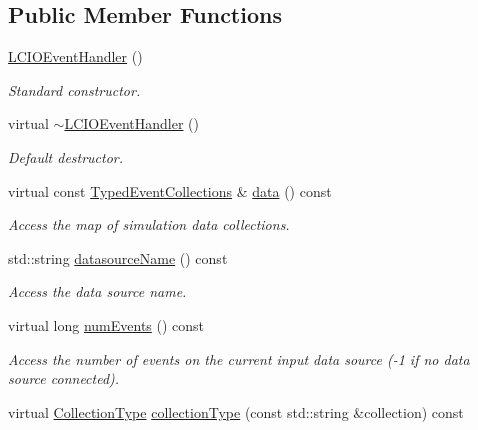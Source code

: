 \subsection*{Public Member Functions}
\begin{DoxyCompactItemize}
\item 
\hyperlink{class_d_d4hep_1_1_l_c_i_o_event_handler_a0b2f4815441b47379605f1059f892a59}{LCIOEventHandler} ()
\begin{DoxyCompactList}\small\item\em Standard constructor. \item\end{DoxyCompactList}\item 
virtual \hyperlink{class_d_d4hep_1_1_l_c_i_o_event_handler_a26f3acb33ae47d75cee43a2268e5945b}{$\sim$LCIOEventHandler} ()
\begin{DoxyCompactList}\small\item\em Default destructor. \item\end{DoxyCompactList}\item 
virtual const \hyperlink{class_d_d4hep_1_1_event_handler_a4d441ff8a824b1e2f278e8b7a6391af3}{TypedEventCollections} \& \hyperlink{class_d_d4hep_1_1_l_c_i_o_event_handler_a7118606d31e1a2a3b988af04a6dbcc2d}{data} () const 
\begin{DoxyCompactList}\small\item\em Access the map of simulation data collections. \item\end{DoxyCompactList}\item 
std::string \hyperlink{class_d_d4hep_1_1_l_c_i_o_event_handler_a5be4ec13eea78675737c710f6505ac33}{datasourceName} () const 
\begin{DoxyCompactList}\small\item\em Access the data source name. \item\end{DoxyCompactList}\item 
virtual long \hyperlink{class_d_d4hep_1_1_l_c_i_o_event_handler_a922a7d225b2e0944c850965f9983758f}{numEvents} () const 
\begin{DoxyCompactList}\small\item\em Access the number of events on the current input data source (-\/1 if no data source connected). \item\end{DoxyCompactList}\item 
virtual \hyperlink{class_d_d4hep_1_1_event_handler_a0b22a141a019364495835317fad48254}{CollectionType} \hyperlink{class_d_d4hep_1_1_l_c_i_o_event_handler_a1bcb144db3e2bb4b5cfe9d54a6824211}{collectionType} (const std::string \&collection) const 

\end{DoxyCompactItemize}
